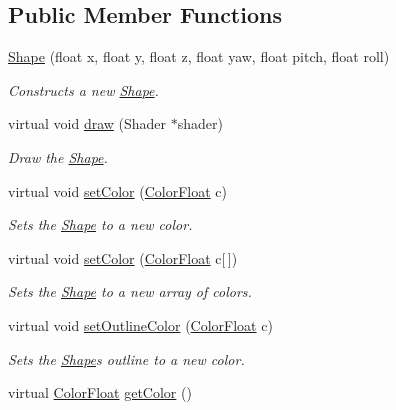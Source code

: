 \subsection*{Public Member Functions}
\begin{DoxyCompactItemize}
\item 
\hyperlink{classtsgl_1_1_shape_a2e6d954b348471650b72d8e0519288ed}{Shape} (float x, float y, float z, float yaw, float pitch, float roll)
\begin{DoxyCompactList}\small\item\em Constructs a new \hyperlink{classtsgl_1_1_shape}{Shape}. \end{DoxyCompactList}\item 
virtual void \hyperlink{classtsgl_1_1_shape_ae0905e73f1652d92cef9c7f2c38572f3}{draw} (Shader $\ast$shader)
\begin{DoxyCompactList}\small\item\em Draw the \hyperlink{classtsgl_1_1_shape}{Shape}. \end{DoxyCompactList}\item 
virtual void \hyperlink{classtsgl_1_1_shape_abdb01321cddfd2db1481eefbc2836f70}{set\+Color} (\hyperlink{structtsgl_1_1_color_float}{Color\+Float} c)
\begin{DoxyCompactList}\small\item\em Sets the \hyperlink{classtsgl_1_1_shape}{Shape} to a new color. \end{DoxyCompactList}\item 
virtual void \hyperlink{classtsgl_1_1_shape_ad7e554b5d4cea111ec518548b9f21388}{set\+Color} (\hyperlink{structtsgl_1_1_color_float}{Color\+Float} c\mbox{[}$\,$\mbox{]})
\begin{DoxyCompactList}\small\item\em Sets the \hyperlink{classtsgl_1_1_shape}{Shape} to a new array of colors. \end{DoxyCompactList}\item 
virtual void \hyperlink{classtsgl_1_1_shape_a30a5a08919f22700ad96ec84de033864}{set\+Outline\+Color} (\hyperlink{structtsgl_1_1_color_float}{Color\+Float} c)
\begin{DoxyCompactList}\small\item\em Sets the \hyperlink{classtsgl_1_1_shape}{Shape}\textquotesingle{}s outline to a new color. \end{DoxyCompactList}\item 
virtual \hyperlink{structtsgl_1_1_color_float}{Color\+Float} \hyperlink{classtsgl_1_1_shape_ab531d3d4ddca94ec14ec29f381eab838}{get\+Color} ()

\end{DoxyCompactItemize}

